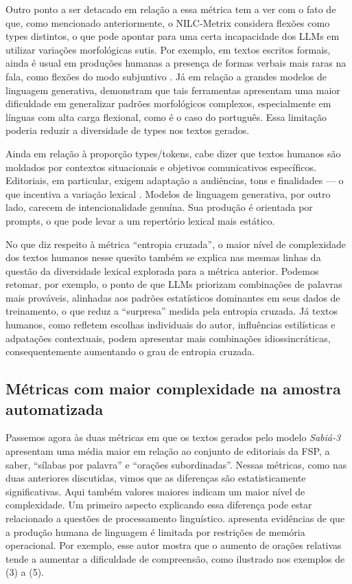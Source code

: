 \documentclass[portuguese]{textolivre}
\begin{document}
Outro ponto a ser detacado em relação a essa métrica tem a ver com o fato de que, como mencionado anteriormente, o NILC-Metrix considera flexões como types distintos, o que pode apontar para uma certa incapacidade dos LLMs em utilizar variações morfológicas sutis.
Por exemplo, em textos escritos formais, ainda é usual em produções humanas a presença de formas verbais mais raras na fala, como flexões do modo subjuntivo \cite{Almeida2010}.
Já em relação a grandes modelos de linguagem generativa, \textcite{Gulordava2018} demonstram que tais ferramentas apresentam uma maior dificuldade em generalizar padrões morfológicos complexos, especialmente em línguas com alta carga flexional, como é o caso do português.
Essa limitação poderia reduzir a diversidade de types nos textos gerados.

Ainda em relação à proporção types/tokens, cabe dizer que textos humanos são moldados por contextos situacionais e objetivos comunicativos específicos.
Editoriais, em particular, exigem adaptação a audiências, tons e finalidades --- o que incentiva a variação lexical \cite{Biber2009}.
Modelos de linguagem generativa, por outro lado, carecem de intencionalidade genuína.
Sua produção é orientada por prompts, o que pode levar a um repertório lexical mais estático.

No que diz respeito à métrica ``entropia cruzada'', o maior nível de complexidade dos textos humanos nesse quesito também se explica nas mesmas linhas da questão da diversidade lexical explorada para a métrica anterior.
Podemos retomar, por exemplo, o ponto de que LLMs priorizam combinações de palavras mais prováveis, alinhadas aos padrões estatísticos dominantes em seus dados de treinamento, o que reduz a ``surpresa'' medida pela entropia cruzada.
Já textos humanos, como refletem escolhas individuais do autor, influências estilísticas e adpatações contextuais, podem apresentar mais combinações idiossincráticas, consequentemente aumentando o grau de entropia cruzada.

\subsection{Métricas com maior complexidade na amostra automatizada}\label{sec-ia}
Passemos agora às duas métricas em que os textos gerados pelo modelo \emph{Sabiá-3} apresentam uma média maior em relação ao conjunto de editoriais da FSP, a saber, ``sílabas por palavra'' e ``orações subordinadas''.
Nessas métricas, como nas duas anteriores discutidas, vimos que as diferenças são estatisticamente significativas.
Aqui também valores maiores indicam um maior nível de complexidade.
Um primeiro aspecto explicando essa diferença pode estar relacionado a questões de processamento linguístico.
\textcite{Gibson2000} apresenta evidências de que a produção humana de linguagem é limitada por restrições de memória operacional.
Por exemplo, esse autor mostra que o aumento de orações relativas tende a aumentar a dificuldade de compreensão, como ilustrado nos exemplos de (3) a (5).
\end{document}
